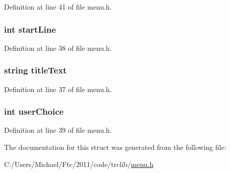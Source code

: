Definition at line 41 of file menu.h.

\hypertarget{struct_m_e_n_u_aae69f615454d4cce6fddf760c20e9eb2}{
\subsubsection[{startLine}]{\setlength{\rightskip}{0pt plus 5cm}int {\bf startLine}}}
\label{struct_m_e_n_u_aae69f615454d4cce6fddf760c20e9eb2}


Definition at line 38 of file menu.h.

\hypertarget{struct_m_e_n_u_a7043504a82f5aa8ca6ae75675e2cd3ab}{
\subsubsection[{titleText}]{\setlength{\rightskip}{0pt plus 5cm}string {\bf titleText}}}
\label{struct_m_e_n_u_a7043504a82f5aa8ca6ae75675e2cd3ab}


Definition at line 37 of file menu.h.

\hypertarget{struct_m_e_n_u_ac273abc09d38d00e33071cfcf40b7335}{
\subsubsection[{userChoice}]{\setlength{\rightskip}{0pt plus 5cm}int {\bf userChoice}}}
\label{struct_m_e_n_u_ac273abc09d38d00e33071cfcf40b7335}


Definition at line 39 of file menu.h.



The documentation for this struct was generated from the following file:\begin{DoxyCompactItemize}
\item 
C:/Users/Michael/Ftc/2011/code/trclib/\hyperlink{menu_8h}{menu.h}\end{DoxyCompactItemize}
